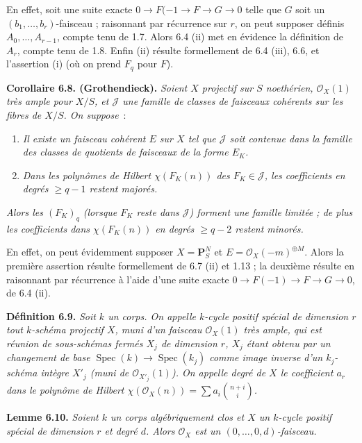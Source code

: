 En effet, soit une suite exacte $0\to F(-1\to F\to G\to0$ telle que $G$ soit un $(b_1,\ldots,b_r)$-faisceau ; raisonnant par r\'ecurrence sur $r$, on peut supposer d\'efinis $A_0,\ldots,A_{r-1}$, compte tenu de 1.7. Alors 6.4 (ii) met en \'evidence la d\'efinition de $A_r$, compte tenu de 1.8. Enfin (ii) r\'esulte formellement de 6.4 (iii), 6.6, et l'assertion (i) (o\`u on prend $F_q$ pour $F$).

\textbf{Corollaire 6.8. (Grothendieck).} \emph{Soient $X$ projectif sur $S$ noeth\'erien, $\mathcal O_X(1)$ tr\`es ample pour $X/S$, et $\mathcal J$ une famille de classes de faisceaux coh\'erents sur les fibres de $X/S$. On suppose}~:
\begin{enumerate}[label=(\alph*)]
\item \emph{Il existe un faisceau coh\'erent $E$ sur $X$ tel que $\mathcal J$ soit contenue dans la famille des classes de quotients de faisceaux de la forme $E_K$.}
\item[$(b_q)$] \emph{Dans les polyn\^omes de Hilbert $\chi(F_K(n))$ des $F_K\in\mathcal J$, les coefficients en degr\'es $\ge q-1$ restent major\'es.}
\end{enumerate}
\emph{Alors les $(F_K)_q$ (lorsque $F_K$ reste dans $\mathcal J$) forment une famille limit\'ee ; de plus les coefficients dans $\chi(F_K(n))$ en degr\'es $\ge q-2$ restent minor\'es.}

En effet, on peut \'evidemment supposer $X=\mathbf P^N_S$ et $E=\mathcal O_X(-m)^{\oplus M}$. Alors la premi\`ere assertion r\'esulte formellement de 6.7 (ii) et 1.13 ; la deuxi\`eme r\'esulte en raisonnant par r\'ecurrence \`a l'aide d'une suite exacte $0\to F(-1)\to F\to G\to0$, de 6.4 (ii).

\textbf{D\'efinition 6.9.} \emph{Soit $k$ un corps. On appelle \emph{$k$-cycle positif sp\'ecial de dimension $r$} tout $k$-sch\'ema projectif $X$, muni d'un faisceau $\mathcal O_X(1)$ tr\`es ample, qui est r\'eunion de sous-sch\'emas ferm\'es $X_j$ de dimension $r$, $X_j$ \'etant obtenu par un changement de base $\operatorname{Spec}(k)\to\operatorname{Spec}(k_j)$ comme image inverse d'un $k_j$-sch\'ema int\`egre $X'_j$ (muni de $\mathcal O_{X'_j}(1)$). On appelle \emph{degr\'e} de $X$ le coefficient $a_r$ dans le polyn\^ome de Hilbert $\chi(\mathcal O_X(n))=\sum a_i\binom{n+i}{i}$.}

\textbf{Lemme 6.10.} \emph{Soient $k$ un corps alg\'ebriquement clos et $X$ un $k$-cycle positif sp\'ecial de dimension $r$ et degr\'e $d$. Alors $\mathcal O_X$ est un $(0,\ldots,0,d)$-faisceau.}


